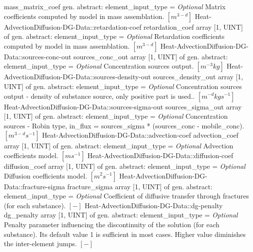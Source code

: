 \begin{RecordType}
			{mass{\_}matrix{\_}coef}
			{{gen. abstract: }}{{element{\_}input{\_}type}{ = }}
			{ \it{Optional}}
			{{{Matrix coefficients computed by model in mass assemblation. }{$[m^{3-d}]$}%
}}
		\RecKey
			{Heat-AdvectionDiffusion-DG-Data::retardation-coef}
			{retardation{\_}coef}
			{{array [1, UINT] of }{gen. abstract: }}{{element{\_}input{\_}type}{ = }}
			{ \it{Optional}}
			{{{Retardation coefficients computed by model in mass assemblation. }{$[m^{3-d}]$}%
}}
		\RecKey
			{Heat-AdvectionDiffusion-DG-Data::sources-conc-out}
			{sources{\_}conc{\_}out}
			{{array [1, UINT] of }{gen. abstract: }}{{element{\_}input{\_}type}{ = }}
			{ \it{Optional}}
			{{{Concentration sources output. }{$[m^{-3}kg]$}%
}}
		\RecKey
			{Heat-AdvectionDiffusion-DG-Data::sources-density-out}
			{sources{\_}density{\_}out}
			{{array [1, UINT] of }{gen. abstract: }}{{element{\_}input{\_}type}{ = }}
			{ \it{Optional}}
			{{{Concentration sources output - density of substance source, only positive part is used.. }{$[m^{-d}kgs^{-1}]$}%
}}
		\RecKey
			{Heat-AdvectionDiffusion-DG-Data::sources-sigma-out}
			{sources{\_}sigma{\_}out}
			{{array [1, UINT] of }{gen. abstract: }}{{element{\_}input{\_}type}{ = }}
			{ \it{Optional}}
			{{{Concentration sources - Robin type, in{\_}flux = sources{\_}sigma * (sources{\_}conc - mobile{\_}conc). }{$[m^{3-d}s^{-1}]$}%
}}
		\RecKey
			{Heat-AdvectionDiffusion-DG-Data::advection-coef}
			{advection{\_}coef}
			{{array [1, UINT] of }{gen. abstract: }}{{element{\_}input{\_}type}{ = }}
			{ \it{Optional}}
			{{{Advection coefficients model. }{$[ms^{-1}]$}%
}}
		\RecKey
			{Heat-AdvectionDiffusion-DG-Data::diffusion-coef}
			{diffusion{\_}coef}
			{{array [1, UINT] of }{gen. abstract: }}{{element{\_}input{\_}type}{ = }}
			{ \it{Optional}}
			{{{Diffusion coefficients model. }{$[m^{2}s^{-1}]$}%
}}
		\RecKey
			{Heat-AdvectionDiffusion-DG-Data::fracture-sigma}
			{fracture{\_}sigma}
			{{array [1, UINT] of }{gen. abstract: }}{{element{\_}input{\_}type}{ = }}
			{ \it{Optional}}
			{{{Coefficient of diffusive transfer through fractures (for each substance). }{$[-]$}%
}}
		\RecKey
			{Heat-AdvectionDiffusion-DG-Data::dg-penalty}
			{dg{\_}penalty}
			{{array [1, UINT] of }{gen. abstract: }}{{element{\_}input{\_}type}{ = }}
			{ \it{Optional}}
			{{{Penalty parameter influencing the discontinuity of the solution (for each substance). Its default value 1 is sufficient in most cases.
Higher value diminishes the inter-element jumps. }{$[-]$}%
}}
\end{RecordType}
